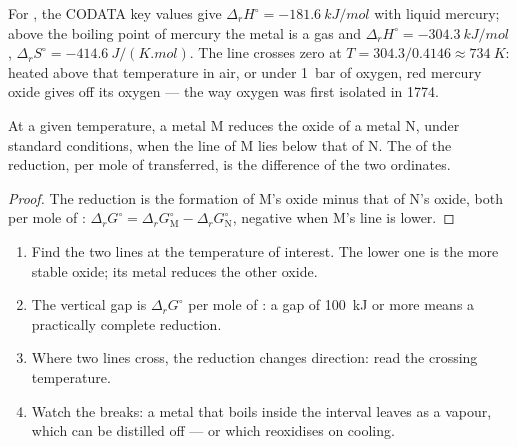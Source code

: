 \begin{example}\label{ex:b2:ellingham:hgo}
For , the CODATA key values give $\Delta_r H^\circ =
\qty{-181.6}{kJ/mol}$ with liquid mercury; above the boiling point of mercury
the metal is a gas and $\Delta_r H^\circ = \qty{-304.3}{kJ/mol}$, $\Delta_r
S^\circ = \qty{-414.6}{J/(K.mol)}$. The line crosses zero at
$T = 304.3/0.4146 \approx \qty{734}{K}$: heated above that temperature in air,
or under \qty{1}{bar} of oxygen, red mercury oxide gives off its oxygen ---
the way oxygen was first isolated in 1774.
\end{example}

\begin{proposition}\label{prop:b2:ellingham:reduction}
At a given temperature, a metal M reduces the oxide of a metal N, under
standard conditions, when the line of M lies below that of N. The  of the reduction, per mole of  transferred, is the
difference of the two ordinates.
\end{proposition}

\begin{proof}
The reduction is the formation of M's oxide minus that of N's oxide, both per
mole of : $\Delta_r G^\circ = \Delta_r G^\circ_{\mathrm M} - \Delta_r
G^\circ_{\mathrm N}$, negative when M's line is lower.
\end{proof}

\begin{method}\label{met:b2:ellingham:read-ellingham}
\begin{enumerate}
  \item Find the two lines at the temperature of interest. The lower one is
        the more stable oxide; its metal reduces the other oxide.
  \item The vertical gap is $\Delta_r G^\circ$ per mole of : a gap of
        \qty{100}{kJ} or more means a practically complete reduction.
  \item Where two lines cross, the reduction changes direction: read the
        crossing temperature.
  \item Watch the breaks: a metal that boils inside the interval leaves as a
        vapour, which can be distilled off --- or which reoxidises on cooling.
\end{enumerate}
\end{method}

